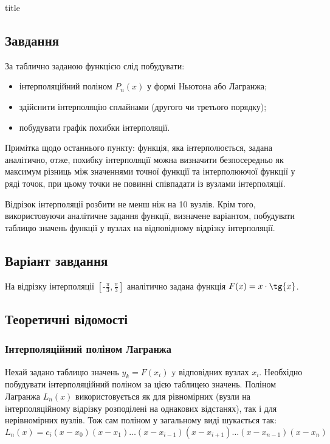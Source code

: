 \documentclass[a4paper,14pt]{extarticle} %
\begin{document}
{title}

\newpage
\subsection*{Завдання}

За таблично заданою функцією слід побудувати:
\begin{itemize}
    \item інтерполяційний поліном $P_n(x)$ у формі Ньютона або Лагранжа;
    \item здійснити інтерполяцію сплайнами (другого чи третього порядку);
    \item побудувати графік похибки інтерполяції. 
\end{itemize}

Примітка щодо останнього пункту: функція, яка інтерполюється, задана аналітично, отже, похибку інтерполяції 
можна визначити безпосередньо як максимум різниць між значеннями точної функції та інтерполюючої функції у 
ряді точок, при цьому точки не повинні співпадати із вузлами інтерполяції.

Відрізок інтерполяції розбити не менш ніж на 10 вузлів. Крім того, використовуючи аналітичне задання функції, 
визначене варіантом, побудувати таблицю значень функції у вузлах на відповідному відрізку інтерполяції.

\subsection*{Варіант завдання}

На відрізку інтерполяції $\left[\text{-}\tfrac{\pi}{3}, \tfrac{\pi}{3}\right]$ аналітично задана функція 
$F(x)=x\cdot\tg{x}$.

\subsection*{Теоретичні відомості}

\subsubsection*{Інтерполяційний поліном Лагранжа}

Нехай задано таблицю значень $y_k=F(x_i)$ y відповідних вузлах $x_i$. Необхідно побудувати інтерполяційний 
поліном за цією таблицею значень. Поліном Лагранжа $L_n(x)$ використовується як для рівномірних (вузли на 
інтерполяційному відрізку розподілені на однакових відстанях), так і для нерівномірних вузлів. Тож сам 
поліном у загальному виді шукається так:
\[ L_n(x)=c_i(x-x_0)(x-x_1)\ldots (x-x_{i-1})(x-x_{i+1})\ldots (x-x_{n-1})(x-x_n) \]
\end{document}
